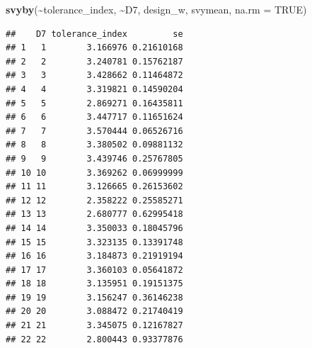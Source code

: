 \documentclass[
]{article}
\newenvironment{Shaded}{\begin{snugshade}}{\end{snugshade}}
\newcommand{\AttributeTok}[1]{\textcolor[rgb]{0.13,0.29,0.53}{#1}}
\newcommand{\ConstantTok}[1]{\textcolor[rgb]{0.56,0.35,0.01}{#1}}
\newcommand{\FunctionTok}[1]{\textcolor[rgb]{0.13,0.29,0.53}{\textbf{#1}}}
\newcommand{\NormalTok}[1]{#1}
\newcommand{\SpecialCharTok}[1]{\textcolor[rgb]{0.81,0.36,0.00}{\textbf{#1}}}
\begin{document}
\begin{Shaded}
\begin{Highlighting}[]
\FunctionTok{svyby}\NormalTok{(}\SpecialCharTok{\textasciitilde{}}\NormalTok{tolerance\_index, }\SpecialCharTok{\textasciitilde{}}\NormalTok{D7, design\_w, svymean, }\AttributeTok{na.rm =} \ConstantTok{TRUE}\NormalTok{)}
\end{Highlighting}
\end{Shaded}

\begin{verbatim}
##    D7 tolerance_index         se
## 1   1        3.166976 0.21610168
## 2   2        3.240781 0.15762187
## 3   3        3.428662 0.11464872
## 4   4        3.319821 0.14590204
## 5   5        2.869271 0.16435811
## 6   6        3.447717 0.11651624
## 7   7        3.570444 0.06526716
## 8   8        3.380502 0.09881132
## 9   9        3.439746 0.25767805
## 10 10        3.369262 0.06999999
## 11 11        3.126665 0.26153602
## 12 12        2.358222 0.25585271
## 13 13        2.680777 0.62995418
## 14 14        3.350033 0.18045796
## 15 15        3.323135 0.13391748
## 16 16        3.184873 0.21919194
## 17 17        3.360103 0.05641872
## 18 18        3.135951 0.19151375
## 19 19        3.156247 0.36146238
## 20 20        3.088472 0.21740419
## 21 21        3.345075 0.12167827
## 22 22        2.800443 0.93377876
\end{verbatim}
\end{document}
